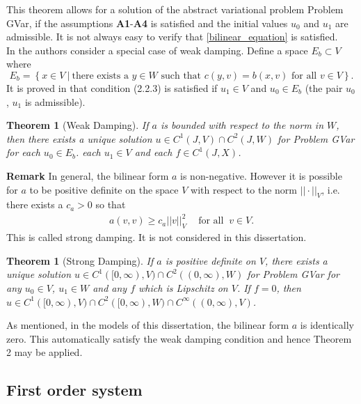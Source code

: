 \documentclass[../../main.tex]{subfiles}
\begin{document}
This theorem allows for a solution of the abstract variational problem Problem GVar, if the assumptions \textbf{A1}-\textbf{A4} is satisfied and the initial values $u_0$ and $u_1$ are admissible. It is not always easy to verify that \eqref{bilinear_equation} is satisfied.\\


In \cite{VV02} the authors consider a special case of weak damping. Define a space $E_b \subset V$ where \[ E_b = \left\{x \in V \ | \ \textrm{there exists a } y \in W \textrm{ such that } c(y,v) = b(x,v) \textrm{ for all } v \in V\right\}.\] It is proved in \cite{VV02}  that condition (2.2.3) is satisfied if $u_1 \in V$ and $u_0 \in E_b$ (the pair $u_0$, $u_1$ is admissible).


\newtheorem{Thm2n}[Thmx]{Theorem}
\begin{Thm2n}[Weak Damping]
	If $a$ is bounded with respect to the norm in $W$, then there exists a unique solution $u\in C^1(J,V)\cap C^2(J,W)$ for Problem GVar for each $u_0 \in E_b$. each $u_1 \in V$ and each $f\in C^1(J,X)$.
\end{Thm2n}

\textbf{Remark} In general, the bilinear form $a$ is non-negative. However it is possible for $a$ to be positive definite on the space $V$ with respect to the norm $||\cdot||_V$, i.e. there exists a $c_a > 0$ so that
\begin{eqnarray*}
	a(v,v) \geq c_a ||v||^2_V \ \ \ \ \textrm{ for all } \ v \in V.
\end{eqnarray*} This is called strong damping. It is not considered in this dissertation.

\newtheorem{Thm3n}[Thmx]{Theorem}
\begin{Thm3n}[Strong Damping]
	If $a$ is positive definite on $V$, there exists a unique solution $u \in C^1([0,\infty),V)\cap C^2((0,\infty),W)$ for Problem GVar for any $u_0 \in V$, $u_1 \in W$ and any $f$ which is Lipschitz on $V$. If $f=0$, then $u \in C^1([0,\infty),V)\cap C^2([0,\infty),W)\cap C^\infty((0,\infty),V)$.
\end{Thm3n} \label{Cinfty}

As mentioned, in the models of this dissertation, the bilinear form $a$ is identically zero. This automatically satisfy the weak damping condition and hence Theorem 2 may be applied.


\subsection{First order system} \label{ssec:existence:AbstractDifferentialEquation}
\end{document}
